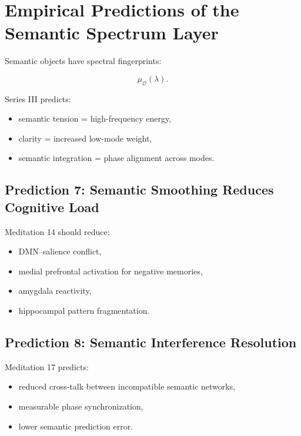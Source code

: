 \documentclass[12pt]{article}
\begin{document}
\newpage


\chapter{Empirical Predictions of the Semantic Spectrum Layer}

Semantic objects have spectral fingerprints:

\[
\mu_{\mathcal O}(\lambda).
\]

Series III predicts:

\begin{itemize}
\item semantic tension = high-frequency energy,
\item clarity = increased low-mode weight,
\item semantic integration = phase alignment across modes.
\end{itemize}

\section{Prediction 7: Semantic Smoothing Reduces Cognitive Load}

Meditation 14 should reduce:

\begin{itemize}
\item DMN--salience conflict,
\item medial prefrontal activation for negative memories,
\item amygdala reactivity,
\item hippocampal pattern fragmentation.
\end{itemize}

\section{Prediction 8: Semantic Interference Resolution}

Meditation 17 predicts:

\begin{itemize}
\item reduced cross-talk between incompatible semantic networks,
\item measurable phase synchronization,
\item lower semantic prediction error.
\end{itemize}
\end{document}
